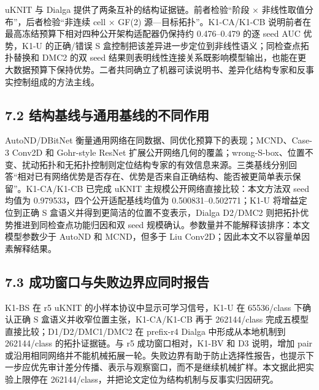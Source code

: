 \documentclass{templates/cjc-utf8}
\begin{document}
uKNIT 与 Dialga 提供了两条互补的结构证据链。前者检验``阶段 ×
非线性取值分布''，后者检验``非连续 cell × GF(2)
源---目标拓扑''。K1-CA/K1-CB
说明前者在最高冻结预算下相对四种公开架构适配器仍保持约 0.476--0.479 的逐
seed AUC 优势，K1-U
的正确/错误 S 盒控制把该差异进一步定位到非线性语义；同检查点拓扑替换和
DMC2 的双 seed
结果则表明线性连接关系既影响模型输出，也能在更大数据预算下保持优势。二者共同确立了机器可读说明书、差异化结构专家和反事实控制组成的方法主线。

\hypertarget{ux7ed3ux6784ux57faux7ebfux4e0eux901aux7528ux57faux7ebfux7684ux4e0dux540cux4f5cux7528}{%
\subsection{7.2
结构基线与通用基线的不同作用}\label{ux7ed3ux6784ux57faux7ebfux4e0eux901aux7528ux57faux7ebfux7684ux4e0dux540cux4f5cux7528}}

AutoND/DBitNet 衡量通用网络在同数据、同优化预算下的表现；MCND、Case-3
Conv2D 和 Gohr-style ResNet
扩展公开网络几何的覆盖；wrong-S-box、位置不变、扰动拓扑和无拓扑控制则定位结构专家的有效信息来源。三类基线分别回答``相对已有网络优势是否存在、优势是否来自正确结构、能否被更简单表示保留''。K1-CA/K1-CB
已完成 uKNIT 主规模公开网络直接比较：本文方法双 seed 均值为
0.979533，四个公开适配基线均值为 0.500831--0.502771；K1-U
将增益定位到正确 S 盒语义并得到更简洁的位置不变表示，Dialga D2/DMC2
则把拓扑优势推进到同检查点功能归因和双 seed
规模确认。参数量并不能解释该排序：本文模型参数少于 AutoND 和
MCND，但多于 Liu Conv2D；因此本文不以容量单因素解释结果。

\hypertarget{ux6210ux529fux7a97ux53e3ux4e0eux5931ux8d25ux8fb9ux754cux5e94ux540cux65f6ux62a5ux544a}{%
\subsection{7.3
成功窗口与失败边界应同时报告}\label{ux6210ux529fux7a97ux53e3ux4e0eux5931ux8d25ux8fb9ux754cux5e94ux540cux65f6ux62a5ux544a}}

K1-BS 在 r5 uKNIT 的小样本协议中显示可学习信号，K1-U 在 65536/class
下确认正确 S 盒语义并收窄位置主张，K1-CA/K1-CB 再于 262144/class
完成五模型直接比较；D1/D2/DMC1/DMC2 在 prefix-r4 Dialga
中形成从本地机制到 262144/class 的拓扑证据链。与 r5
成功窗口相对，K1-BV 和 D3 说明，增加 pair
或沿用相同网络并不能机械拓展一轮。失败边界有助于防止选择性报告，也提示下一步应优先审计差分传播、表示与观察窗口，而不是继续机械扩样。本文据此把实验上限停在
262144/class，并把论文定位为结构机制与反事实归因研究。
\end{document}
